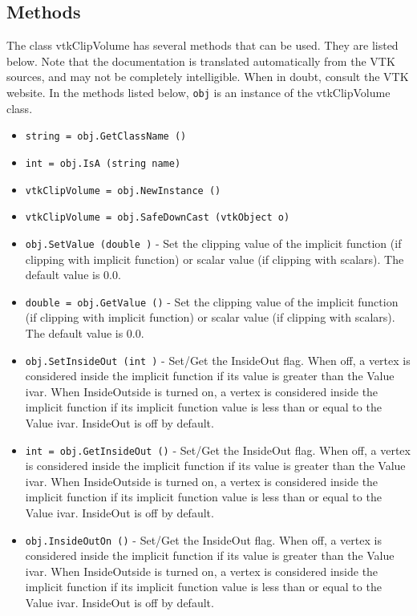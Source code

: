 \subsection{Methods}

The class vtkClipVolume has several methods that can be used.
  They are listed below.
Note that the documentation is translated automatically from the VTK sources,
and may not be completely intelligible.  When in doubt, consult the VTK website.
In the methods listed below, \verb|obj| is an instance of the vtkClipVolume class.
\begin{itemize}
\item  \verb|string = obj.GetClassName ()|

\item  \verb|int = obj.IsA (string name)|

\item  \verb|vtkClipVolume = obj.NewInstance ()|

\item  \verb|vtkClipVolume = obj.SafeDownCast (vtkObject o)|

\item  \verb|obj.SetValue (double )| -  Set the clipping value of the implicit function (if clipping with
 implicit function) or scalar value (if clipping with scalars). The
 default value is 0.0.

\item  \verb|double = obj.GetValue ()| -  Set the clipping value of the implicit function (if clipping with
 implicit function) or scalar value (if clipping with scalars). The
 default value is 0.0.

\item  \verb|obj.SetInsideOut (int )| -  Set/Get the InsideOut flag. When off, a vertex is considered inside the
 implicit function if its value is greater than the Value ivar. When
 InsideOutside is turned on, a vertex is considered inside the implicit
 function if its implicit function value is less than or equal to the
 Value ivar.  InsideOut is off by default.

\item  \verb|int = obj.GetInsideOut ()| -  Set/Get the InsideOut flag. When off, a vertex is considered inside the
 implicit function if its value is greater than the Value ivar. When
 InsideOutside is turned on, a vertex is considered inside the implicit
 function if its implicit function value is less than or equal to the
 Value ivar.  InsideOut is off by default.

\item  \verb|obj.InsideOutOn ()| -  Set/Get the InsideOut flag. When off, a vertex is considered inside the
 implicit function if its value is greater than the Value ivar. When
 InsideOutside is turned on, a vertex is considered inside the implicit
 function if its implicit function value is less than or equal to the
 Value ivar.  InsideOut is off by default.


\end{itemize}
